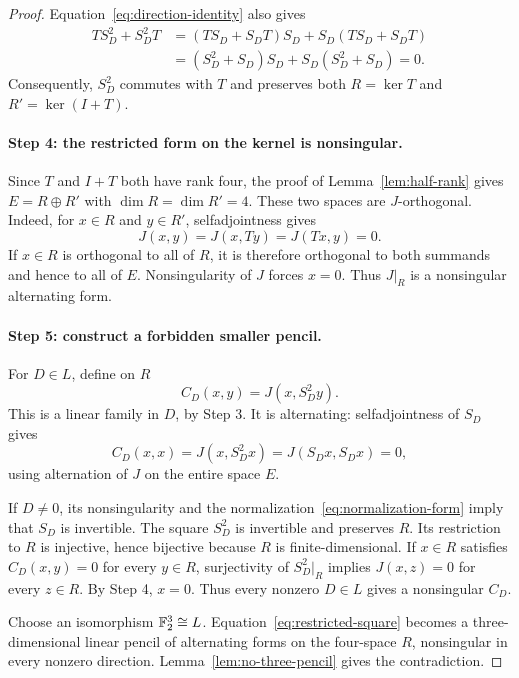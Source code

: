 \begin{proof}
Equation~\eqref{eq:direction-identity} also gives
\begin{align*}
TS_D^2+S_D^2T
&=(TS_D+S_DT)S_D+S_D(TS_D+S_DT)\\
&=(S_D^2+S_D)S_D+S_D(S_D^2+S_D)=0.
\end{align*}
Consequently, $S_D^2$ commutes with $T$ and preserves both $R=\ker T$ and $R'=\ker(I+T)$.

\paragraph{Step 4: the restricted form on the kernel is nonsingular.}
Since $T$ and $I+T$ both have rank four, the proof of Lemma~\ref{lem:half-rank} gives $E=R\oplus R'$ with $\dim R=\dim R'=4$. These two spaces are $J$-orthogonal. Indeed, for $x\in R$ and $y\in R'$, selfadjointness gives
\[
J(x,y)=J(x,Ty)=J(Tx,y)=0.
\]
If $x\in R$ is orthogonal to all of $R$, it is therefore orthogonal to both summands and hence to all of $E$. Nonsingularity of $J$ forces $x=0$. Thus $J|_R$ is a nonsingular alternating form.

\paragraph{Step 5: construct a forbidden smaller pencil.}
For $D\in L$, define on $R$
\begin{equation}\label{eq:restricted-square}
C_D(x,y)=J(x,S_D^2y).
\end{equation}
This is a linear family in $D$, by Step 3. It is alternating: selfadjointness of $S_D$ gives
\[
C_D(x,x)=J(x,S_D^2x)=J(S_Dx,S_Dx)=0,
\]
using alternation of $J$ on the entire space $E$.

If $D\ne0$, its nonsingularity and the normalization~\eqref{eq:normalization-form} imply that $S_D$ is invertible. The square $S_D^2$ is invertible and preserves $R$. Its restriction to $R$ is injective, hence bijective because $R$ is finite-dimensional. If $x\in R$ satisfies $C_D(x,y)=0$ for every $y\in R$, surjectivity of $S_D^2|_R$ implies $J(x,z)=0$ for every $z\in R$. By Step 4, $x=0$. Thus every nonzero $D\in L$ gives a nonsingular $C_D$.

Choose an isomorphism $\mathbb F_2^3\cong L$. Equation~\eqref{eq:restricted-square} becomes a three-dimensional linear pencil of alternating forms on the four-space $R$, nonsingular in every nonzero direction. Lemma~\ref{lem:no-three-pencil} gives the contradiction.
\end{proof}

